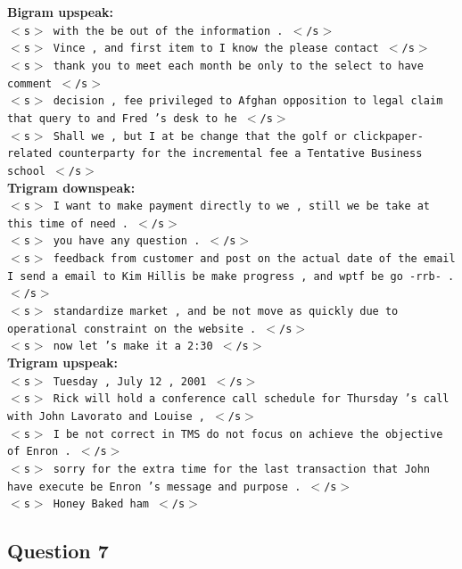 \documentclass{article} %
\begin{document}
\textbf{Bigram upspeak: }\\

\texttt{$<$s$>$ with the be out of the information . $<$/s$>$\\
$<$s$>$ Vince , and first item to I know the please contact $<$/s$>$\\
$<$s$>$ thank you to meet each month be only to the select to have comment $<$/s$>$\\
$<$s$>$ decision , fee privileged to Afghan opposition to legal claim that query to and Fred 's desk to he $<$/s$>$\\
$<$s$>$ Shall we , but I at be change that the golf or clickpaper-related counterparty for the incremental fee a Tentative Business school $<$/s$>$}\\

\textbf{Trigram downspeak:}\\

\texttt{$<$s$>$ I want to make payment directly to we , still we be take at this time of need . $<$/s$>$\\
$<$s$>$ you have any question . $<$/s$>$\\
$<$s$>$ feedback from customer and post on the actual date of the email I send a email to Kim Hillis be make progress , and wptf be go -rrb- . $<$/s$>$\\
$<$s$>$ standardize market , and be not move as quickly due to operational constraint on the website . $<$/s$>$\\
$<$s$>$ now let 's make it a 2:30 $<$/s$>$}\\

\textbf{Trigram upspeak:}\\

\texttt{$<$s$>$ Tuesday , July 12 , 2001 $<$/s$>$\\
$<$s$>$ Rick will hold a conference call schedule for Thursday 's call with John Lavorato and Louise , $<$/s$>$\\
$<$s$>$ I be not correct in TMS do not focus on achieve the objective of Enron . $<$/s$>$\\
$<$s$>$ sorry for the extra time for the last transaction that John have execute be Enron 's message and purpose . $<$/s$>$\\
$<$s$>$ Honey Baked ham $<$/s$>$}


\subsection*{Question 7}
\end{document}
